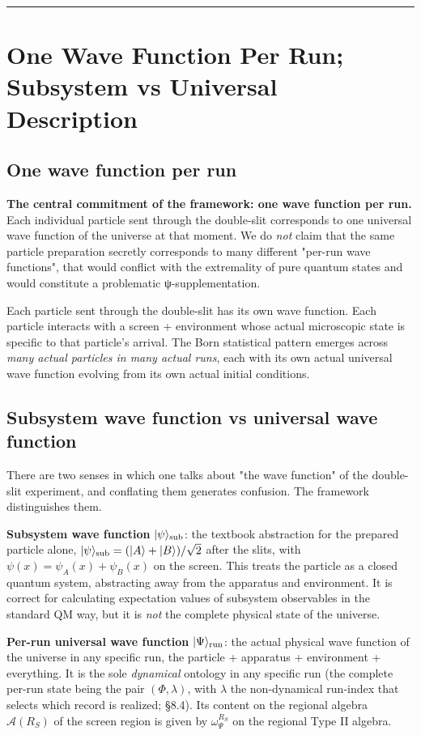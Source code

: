\documentclass[11pt,a4paper]{article}
\begin{document}
\medskip\hrule\medskip

\section{One Wave Function Per Run; Subsystem vs Universal Description}

\subsection{One wave function per run}

\textbf{The central commitment of the framework: one wave function per run.} Each individual particle sent through the double-slit corresponds to one universal wave function of the universe at that moment. We do \emph{not} claim that the same particle preparation secretly corresponds to many different "per-run wave functions", that would conflict with the extremality of pure quantum states and would constitute a problematic ψ-supplementation.

Each particle sent through the double-slit has its own wave function. Each particle interacts with a screen + environment whose actual microscopic state is specific to that particle's arrival. The Born statistical pattern emerges across \emph{many actual particles in many actual runs}, each with its own actual universal wave function evolving from its own actual initial conditions.

\subsection{Subsystem wave function vs universal wave function}

There are two senses in which one talks about "the wave function" of the double-slit experiment, and conflating them generates confusion. The framework distinguishes them.

\textbf{Subsystem wave function} $|\psi\rangle_{\rm sub}$: the textbook abstraction for the prepared particle alone, $|\psi\rangle_{\rm sub} = (|A\rangle + |B\rangle)/\sqrt{2}$ after the slits, with $\psi(x) = \psi_A(x) + \psi_B(x)$ on the screen. This treats the particle as a closed quantum system, abstracting away from the apparatus and environment. It is correct for calculating expectation values of subsystem observables in the standard QM way, but it is \emph{not} the complete physical state of the universe.

\textbf{Per-run universal wave function} $|\Psi\rangle_{\rm run}$: the actual physical wave function of the universe in any specific run, the particle + apparatus + environment + everything. It is the sole \emph{dynamical} ontology in any specific run (the complete per-run state being the pair $(\Phi, \lambda)$, with $\lambda$ the non-dynamical run-index that selects which record is realized; §8.4). Its content on the regional algebra $\hat{\mathcal{A}}(R_S)$ of the screen region is given by $\omega_\Psi^{R_S}$ on the regional Type II algebra.
\end{document}

